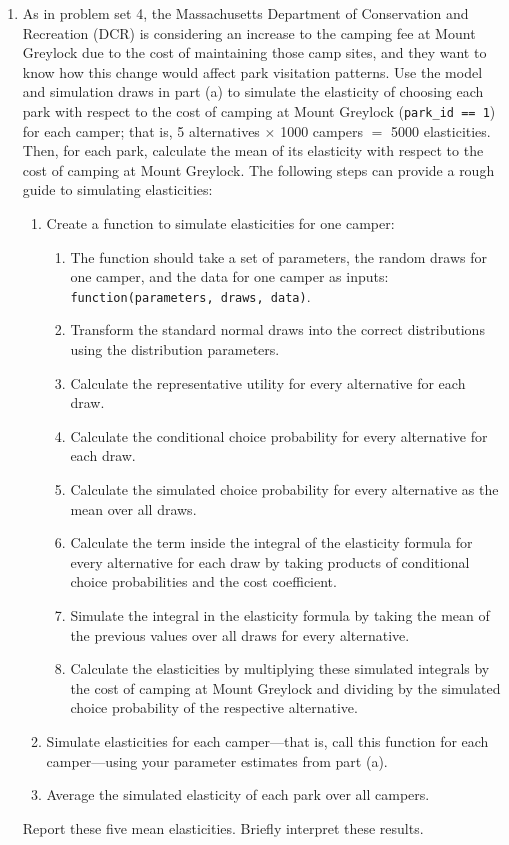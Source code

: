 \documentclass[11pt,letterpaper]{article}
\begin{document}
\begin{enumerate}[label=\alph*., leftmargin=*]
	\item As in problem set 4, the Massachusetts Department of Conservation and Recreation (DCR) is considering an increase to the camping fee at Mount Greylock due to the cost of maintaining those camp sites, and they want to know how this change would affect park visitation patterns. Use the model and simulation draws in part (a) to simulate the elasticity of choosing each park with respect to the cost of camping at Mount Greylock (\texttt{park\_id == 1}) for each camper; that is, 5 alternatives $\times$ 1000 campers $=$ 5000 elasticities. Then, for each park, calculate the mean of its elasticity with respect to the cost of camping at Mount Greylock. The following steps can provide a rough guide to simulating elasticities:
	\begin{enumerate}[label=\Roman*.]
		\item Create a function to simulate elasticities for one camper:
		\begin{enumerate}[label=\roman*.]
			\item The function should take a set of parameters, the random draws for one camper, and the data for one camper as inputs: \texttt{function(parameters, draws, data)}.
			\item Transform the standard normal draws into the correct distributions using the distribution parameters.
			\item Calculate the representative utility for every alternative for each draw.
			\item Calculate the conditional choice probability for every alternative for each draw.
			\item Calculate the simulated choice probability for every alternative as the mean over all draws.
			\item Calculate the term inside the integral of the elasticity formula for every alternative for each draw by taking products of conditional choice probabilities and the cost coefficient.
			\item Simulate the integral in the elasticity formula by taking the mean of the previous values over all draws for every alternative.
			\item Calculate the elasticities by multiplying these simulated integrals by the cost of camping at Mount Greylock and dividing by the simulated choice probability of the respective alternative.
		\end{enumerate}
		\item Simulate elasticities for each camper---that is, call this function for each camper---using your parameter estimates from part (a).
		\item Average the simulated elasticity of each park over all campers.
	\end{enumerate}
	Report these five mean elasticities. Briefly interpret these results.
\end{enumerate}
\end{document}
